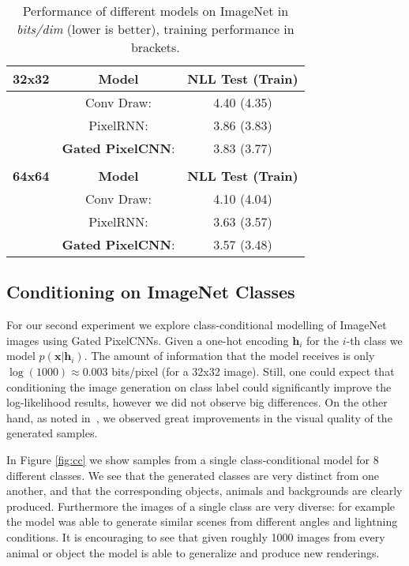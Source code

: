 \documentclass{article}
\renewcommand{\vec}{\mathbf}
\begin{document}
\begin{table}[h]
\centering
  \begin{tabular}{lcc}
    \toprule
    \textbf{32x32} & \textbf{Model} & \textbf{NLL Test (Train)}  \\ 
    \midrule
      & Conv Draw: \cite{conceptcompression} & 4.40 (4.35) \\
      & PixelRNN: \cite{van2016pixel} & 3.86 (3.83) \\ 
      & \textbf{Gated PixelCNN}: & 3.83 (3.77) \\
    \\
    \textbf{64x64} & \textbf{Model} & \textbf{NLL Test (Train)}  \\ 
    \midrule
      & Conv Draw: \cite{conceptcompression} & 4.10 (4.04) \\
      & PixelRNN: \cite{van2016pixel} & 3.63 (3.57) \\ 
      & \textbf{Gated PixelCNN}: & 3.57 (3.48) \\
    \bottomrule
  \end{tabular}
\vspace{5pt}
\caption{Performance of different models on ImageNet in \emph{bits/dim} (lower is better), training performance in brackets.}
\label{table:imnet}
\end{table}

\subsection{Conditioning on ImageNet Classes}

For our second experiment we explore class-conditional modelling of ImageNet images using Gated PixelCNNs. Given a one-hot encoding $\vec{h}_i$ for the $i$-th class we model $p(\vec{x}|\vec{h}_i)$. The amount of information that the model receives is only $\log(1000) \approx 0.003$ bits/pixel (for a 32x32 image). Still, one could expect that conditioning the image generation on class label could significantly improve the log-likelihood results, however we did not observe big differences. On the other hand, as noted in~\cite{theis2015note}, we  observed great improvements in the visual quality of the generated samples.

In Figure \ref{fig:cc} we show samples from a single class-conditional model for 8 different classes. We see that the generated classes are very distinct from one another, and that the corresponding objects, animals and backgrounds are clearly produced. Furthermore the images of a single class are very diverse: for example the model was able to generate similar scenes from different angles and lightning conditions. 
It is encouraging to see that given roughly 1000 images from every animal or object the model is able to generalize and produce new renderings. 
\end{document}
